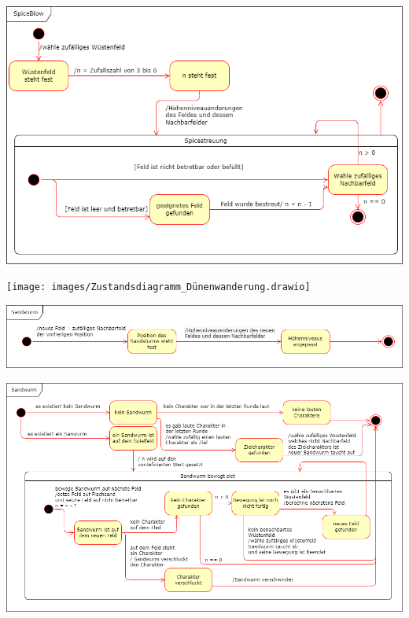 \documentclass[12pt]{article}
\newcounter{fa}
\begin{document}
\includegraphics[width=\textwidth]{images/Zustandsdiagramm_SpiceBlow.drawio}
\label{fig:state-mashine-spiceblow}

\texttt{[image: images/Zustandsdiagramm\_Dünenwanderung.drawio]}
\label{fig:state-mashine-dunechanging}

\includegraphics[width=\textwidth]{images/Zustandsdiagramm_SandSturm.drawio}
\label{fig:state-mashine-sandstorm}

\includegraphics[width=\textwidth]{images/Zustandsdiagramm_SandWurm.drawio}
\label{fig:state-mashine-sandworm}
\end{document}
